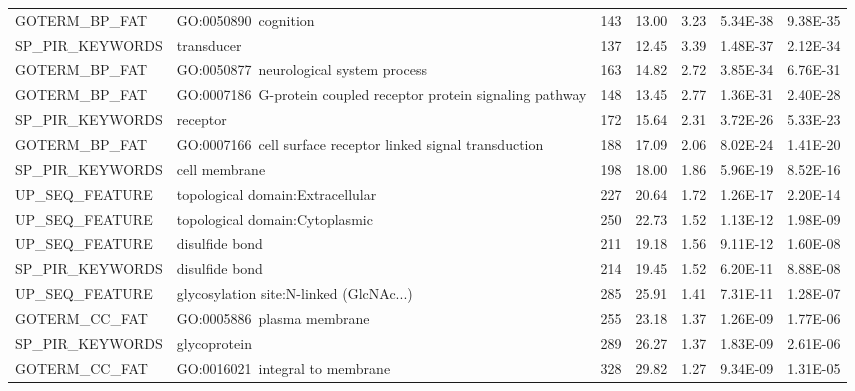 \documentclass[a4paper,10pt,oneside]{book}
\begin{document}
{\begin{longtable}{lllllll}
GOTERM\_BP\_FAT   & GO:0050890~cognition                                            & 143   & 13.00 & 3.23            & 5.34E-38 & 9.38E-35 \\
SP\_PIR\_KEYWORDS & transducer                                                      & 137   & 12.45 & 3.39            & 1.48E-37 & 2.12E-34 \\
GOTERM\_BP\_FAT   & GO:0050877~neurological system process                          & 163   & 14.82 & 2.72            & 3.85E-34 & 6.76E-31 \\
GOTERM\_BP\_FAT   & GO:0007186~G-protein coupled receptor protein signaling pathway & 148   & 13.45 & 2.77            & 1.36E-31 & 2.40E-28 \\
SP\_PIR\_KEYWORDS & receptor                                                        & 172   & 15.64 & 2.31            & 3.72E-26 & 5.33E-23 \\
GOTERM\_BP\_FAT   & GO:0007166~cell surface receptor linked signal transduction     & 188   & 17.09 & 2.06            & 8.02E-24 & 1.41E-20 \\
SP\_PIR\_KEYWORDS & cell membrane                                                   & 198   & 18.00 & 1.86            & 5.96E-19 & 8.52E-16 \\
UP\_SEQ\_FEATURE  & topological domain:Extracellular                                & 227   & 20.64 & 1.72            & 1.26E-17 & 2.20E-14 \\
UP\_SEQ\_FEATURE  & topological domain:Cytoplasmic                                  & 250   & 22.73 & 1.52            & 1.13E-12 & 1.98E-09 \\
UP\_SEQ\_FEATURE  & disulfide bond                                                  & 211   & 19.18 & 1.56            & 9.11E-12 & 1.60E-08 \\
SP\_PIR\_KEYWORDS & disulfide bond                                                  & 214   & 19.45 & 1.52            & 6.20E-11 & 8.88E-08 \\
UP\_SEQ\_FEATURE  & glycosylation site:N-linked (GlcNAc...)                         & 285   & 25.91 & 1.41            & 7.31E-11 & 1.28E-07 \\
GOTERM\_CC\_FAT   & GO:0005886~plasma membrane                                      & 255   & 23.18 & 1.37            & 1.26E-09 & 1.77E-06 \\
SP\_PIR\_KEYWORDS & glycoprotein                                                    & 289   & 26.27 & 1.37            & 1.83E-09 & 2.61E-06 \\
GOTERM\_CC\_FAT   & GO:0016021~integral to membrane                                 & 328   & 29.82 & 1.27            & 9.34E-09 & 1.31E-05 \\

\end{longtable}}
\end{document}
